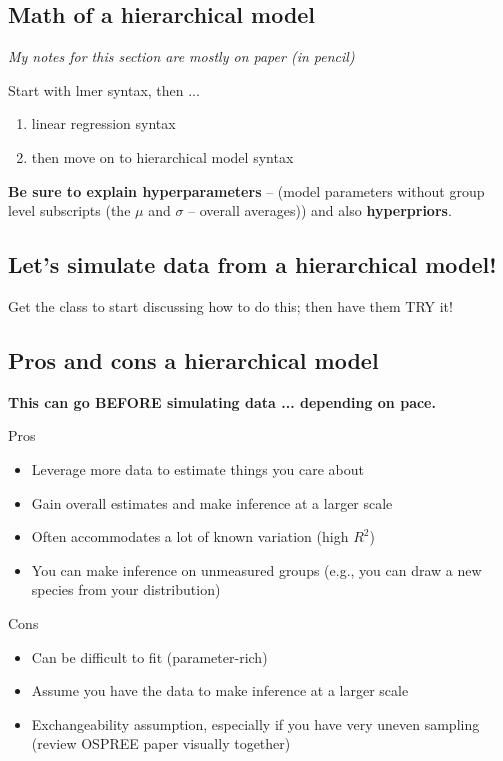 \documentclass[11pt]{article}
\begin{document}
\subsection{Math of a hierarchical model}
\emph{My notes for this section are mostly on paper (in pencil)}

Start with lmer syntax, then ...
\begin{enumerate}
\item linear regression syntax
\item then move on to hierarchical model syntax
\end{enumerate}

{\bf Be sure to explain hyperparameters} -- (model parameters without group level subscripts (the $\mu$ and $\sigma$ -- overall averages)) and also {\bf hyperpriors}.

\subsection{Let's simulate data from a hierarchical model!}

Get the class to start discussing how to do this; then have them TRY it!


\subsection{Pros and cons a hierarchical model}
{\bf This can go BEFORE simulating data ... depending on pace.}

Pros
\begin{itemize}
\item Leverage more data to estimate things you care about
\item Gain overall estimates and make inference at a larger scale
\item Often accommodates a lot of known variation (high $R^2$)
\item You can make inference on unmeasured groups (e.g., you can draw a new species from your distribution)
\end{itemize}

Cons
\begin{itemize}
\item Can be difficult to fit (parameter-rich)
\item Assume you have the data to make inference at a larger scale
\item Exchangeability assumption, especially if you have very uneven sampling (review OSPREE paper visually together)
\end{itemize}
 
\end{document}
